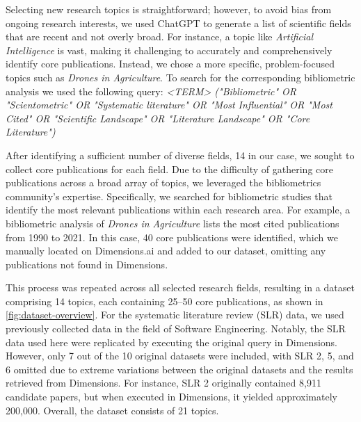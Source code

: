 Selecting new research topics is straightforward; however, to avoid bias from ongoing research interests, we used ChatGPT to generate a list of scientific fields that are recent and not overly broad. For instance, a topic like \textit{Artificial Intelligence} is vast, making it challenging to accurately and comprehensively identify core publications. Instead, we chose a more specific, problem-focused topics such as \textit{Drones in Agriculture}. To search for the corresponding bibliometric analysis we used the following query: \textit{<TERM>  ("Bibliometric" OR "Scientometric" OR "Systematic literature" OR "Most Influential" OR "Most Cited" OR "Scientific Landscape" OR "Literature Landscape" OR "Core Literature")} 


After identifying a sufficient number of diverse fields, 14 in our case, we sought to collect core publications for each field. Due to the difficulty of gathering core publications across a broad array of topics, we leveraged the bibliometrics community’s expertise. Specifically, we searched for bibliometric studies that identify the most relevant publications within each research area. For example, a bibliometric analysis of \textit{Drones in Agriculture} \autocite{Rejeb2022} lists the most cited publications from 1990 to 2021. In this case, 40 core publications were identified, which we manually located on Dimensions.ai and added to our dataset, omitting any publications not found in Dimensions.

This process was repeated across all selected research fields, resulting in a dataset comprising 14 topics, each containing 25–50 core publications, as shown in \autoref{fig:dataset-overview}. For the systematic literature review (SLR) data, we used previously collected data \autocite{badami2023adaptive} in the field of Software Engineering. Notably, the SLR data used here were replicated by executing the original query in Dimensions. However, only 7 out of the 10 original datasets were included, with SLR 2, 5, and 6 omitted due to extreme variations between the original datasets and the results retrieved from Dimensions. For instance, SLR 2 originally contained 8,911 candidate papers, but when executed in Dimensions, it yielded approximately 200,000. Overall, the dataset consists of 21 topics.


